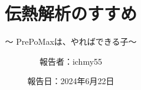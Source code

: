 %
\title{伝熱解析のすすめ}
\subtitle{～ PrePoMaxは、やればできる子～}
%
%
%
\date[Jun.22nd,2024]{報告日：2024年6月22日}
\author[ichmy55]{報告者：ichmy55}
\subject{Usage example of PrePoMax}
